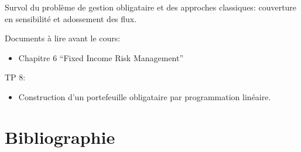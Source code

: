 \documentclass[
  11pt,
]{article}
\providecommand{\tightlist}{%
  \setlength{\itemsep}{0pt}\setlength{\parskip}{0pt}}
\begin{document}
Survol du problème de gestion obligataire et des approches classiques:
couverture en sensibilité et adossement des flux.

Documents à lire avant le cours:

\begin{itemize}
\tightlist
\item
  Chapitre 6 ``Fixed Income Risk Management''
\end{itemize}

TP 8:

\begin{itemize}
\tightlist
\item
  Construction d'un portefeuille obligataire par programmation linéaire.
\end{itemize}

\hypertarget{bibliographie}{%
\section*{Bibliographie}\label{bibliographie}}
\end{document}
